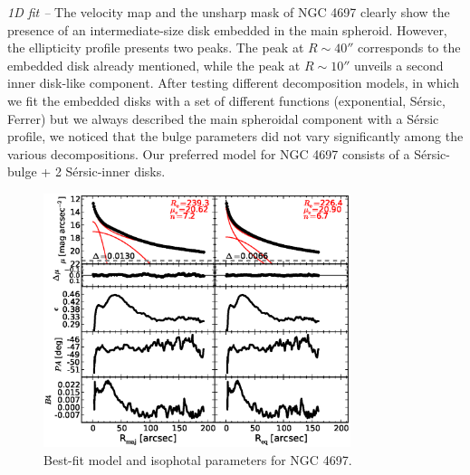 \documentclass[preprint2]{emulateapj}
\newcommand{\fitfigurewidth}{0.8\textwidth}
\begin{document}
  \emph{1D fit -- }
  The velocity map and the unsharp mask of NGC 4697 clearly show 
  the presence of an intermediate-size disk embedded in the main spheroid.
  However, the ellipticity profile presents two peaks. 
  The peak at $R \sim 40''$ corresponds to the embedded disk already mentioned,
  while the peak at $R \sim 10''$ unveils a second inner disk-like component.
  After testing different decomposition models, 
  in which we fit the embedded disks with a set of different functions (exponential, S\'ersic, Ferrer)
  but we always described the main spheroidal component with a S\'ersic profile,
  we noticed that the bulge parameters did not vary significantly among the various decompositions.
  Our preferred model for NGC 4697 consists of a S\'ersic-bulge + 2 S\'ersic-inner disks.

  \begin{figure}[h]
  \begin{center}
  \includegraphics[width=\fitfigurewidth]{images/n4697_1Dfit.eps}
  \caption{Best-fit model and isophotal parameters for NGC 4697.}
  \end{center}
  \end{figure}
\end{document}
